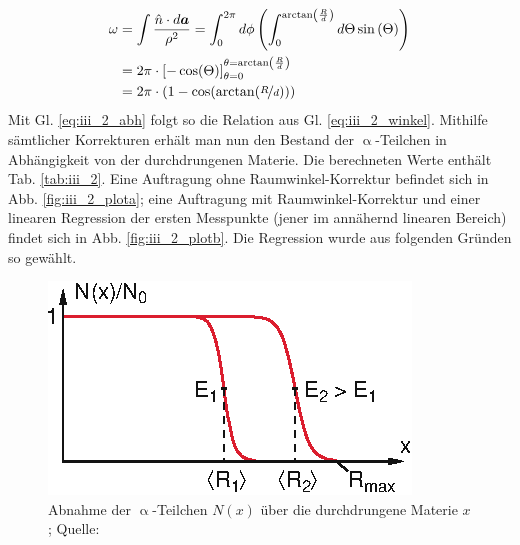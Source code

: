 \begin{align}
\omega &= \int \frac{\hat{n}\cdot d\vec{a}}{\rho^2} = \int_0^{2 \pi} d\phi \left( \int_0^{\arctan\left(\frac{R}{d}\right)} d\Theta \sin\left(\Theta\right) \right)\nonumber\\
&= 2\pi \cdot \left[ -\cos(\Theta) \right]_{\theta=0}^{\theta=\arctan\left(\frac{R}{d}\right)}\nonumber\\
&= 2\pi \cdot (1-\cos(\arctan(\nicefrac{R}{d})))
\end{align}
Mit Gl. \eqref{eq:iii_2_abh} folgt so die Relation aus Gl. \eqref{eq:iii_2_winkel}. Mithilfe sämtlicher Korrekturen erhält man nun den Bestand der $\upalpha$-Teilchen in Abhängigkeit von der durchdrungenen Materie. Die berechneten Werte enthält Tab. \ref{tab:iii_2}. Eine Auftragung ohne Raumwinkel-Korrektur befindet sich in Abb. \ref{fig:iii_2_plota}; eine Auftragung mit Raumwinkel-Korrektur und einer linearen Regression der ersten Messpunkte (jener im annähernd linearen Bereich) findet sich in Abb. \ref{fig:iii_2_plotb}. Die Regression wurde aus folgenden Gründen so gewählt.

\begin{figure}[ht]
\centering
\includegraphics[scale=1.5]{fig/iii_2_dem.eps}
\caption{Abnahme der $\upalpha$-Teilchen $N(x)$ über die durchdrungene Materie $x$; Quelle: \cite[S. 90]{Dem10}}
\label{fig:iii_2_dem}
\end{figure}

